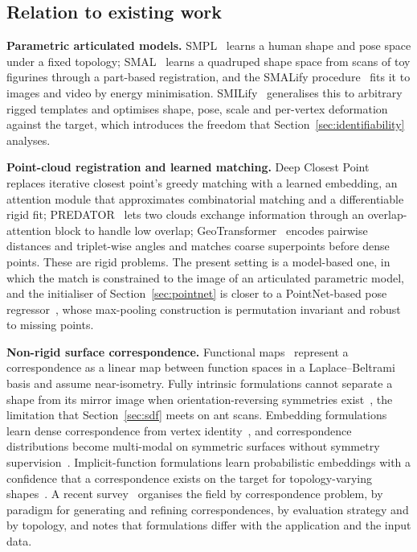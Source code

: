 \subsection{Relation to existing work}

\textbf{Parametric articulated models.} SMPL~\cite{smpl} learns a human shape and
pose space under a fixed topology; SMAL~\cite{smal} learns a quadruped shape space
from scans of toy figurines through a part-based registration, and the SMALify
procedure~\cite{smalify} fits it to images and video by energy minimisation.
SMILify~\cite{smilify} generalises this to arbitrary rigged templates and optimises
shape, pose, scale and per-vertex deformation against the target, which introduces
the freedom that Section~\ref{sec:identifiability} analyses.

\textbf{Point-cloud registration and learned matching.} Deep Closest Point~\cite{dcp}
replaces iterative closest point's greedy matching with a learned embedding, an
attention module that approximates combinatorial matching and a differentiable
rigid fit; PREDATOR~\cite{predator} lets two clouds exchange information through
an overlap-attention block to handle low overlap; GeoTransformer~\cite{geotransformer}
encodes pairwise distances and triplet-wise angles and matches coarse superpoints
before dense points. These are rigid problems. The present setting is a model-based
one, in which the match is constrained to the image of an articulated parametric
model, and the initialiser of Section~\ref{sec:pointnet} is closer to a
PointNet-based pose regressor~\cite{pointnet}, whose max-pooling construction is
permutation invariant and robust to missing points.

\textbf{Non-rigid surface correspondence.} Functional maps~\cite{fmaps} represent a
correspondence as a linear map between function spaces in a Laplace--Beltrami basis
and assume near-isometry. Fully intrinsic formulations cannot separate a shape from
its mirror image when orientation-reversing symmetries exist~\cite{donati}, the
limitation that Section~\ref{sec:sdf} meets on ant scans. Embedding formulations
learn dense correspondence from vertex identity~\cite{cse}, and correspondence
distributions become multi-modal on symmetric surfaces without symmetry
supervision~\cite{haugaard}. Implicit-function formulations learn probabilistic
embeddings with a confidence that a correspondence exists on the target for
topology-varying shapes~\cite{liu2020}. A recent survey~\cite{survey}
organises the field by correspondence problem, by paradigm for generating and
refining correspondences, by evaluation strategy and by topology, and notes that
formulations differ with the application and the input data.

